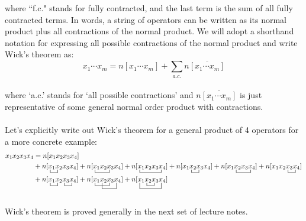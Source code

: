 \documentclass{article}
\newcommand{\ol}{\overline}
\newcommand{\ctr}{\bcontraction}
\newcommand{\cd}{\ensuremath{\cdots} }
\begin{document}
where ``f.c." stands for fully contracted, and the last term is the sum of all fully contracted terms.
In words, a string of operators can be written as its normal product plus all contractions of the normal product. 
We will adopt a shorthand notation for expressing all possible contractions of the normal product and write Wick's theorem as: 
\[x_1 \cd x_m = n[x_1 \cd x_m ]  + \sum_{a.c.} n\ol{[x_1 \cd x_m ]} \]\\
where `a.c.' stands for `all possible contractions' and $n\ol{[x_1 \cd x_m ]}$ is just representative of some general normal order product with contractions. 
\\ \\
Let's explicitly write out Wick's theorem for a general product of 4 operators for a more concrete example: 
\begin{align*}
x_1x_2x_3x_4 &= n[x_1x_2x_3x_4 ] \\ 
&+n[ \ctr{}{x}{{}_1}{x} x_1x_2x_3x_4 ] + n[ \ctr{}{x}{{}_1x_2}{x} x_1x_2x_3x_4 ] + n[ \ctr{}{x}{{}_1x_2 x_3}{x} x_1x_2x_3x_4 ] 
+ n[ \ctr{x_1}{x}{{}_2}{x} x_1x_2x_3x_4 ] +  n[ \ctr{x_1}{x}{{}_2 x_3}{x} x_1x_2x_3x_4 ] + n[ \ctr{x_1 x_2}{x}{{}_3}{x} x_1x_2x_3x_4 ] \\
&+ n[ \ctr{}{x}{{}_1}{x}  \ctr{x_1 x_2}{x}{{}_3}{x} x_1x_2x_3x_4 ]
+ n[ \ctr{}{x}{{}_1x_2}{x}  \ctr[2ex]{x_1}{x}{{}_2 x_3}{x} x_1x_2x_3x_4 ] 
+ n[ \ctr{x_1}{x}{{}_2}{x} \ctr[2ex]{}{x}{{}_1x_2 x_3}{x}      x_1x_2x_3x_4 ] 
\end{align*}
\\
Wick's theorem is proved generally in the next set of lecture notes.
\end{document}
